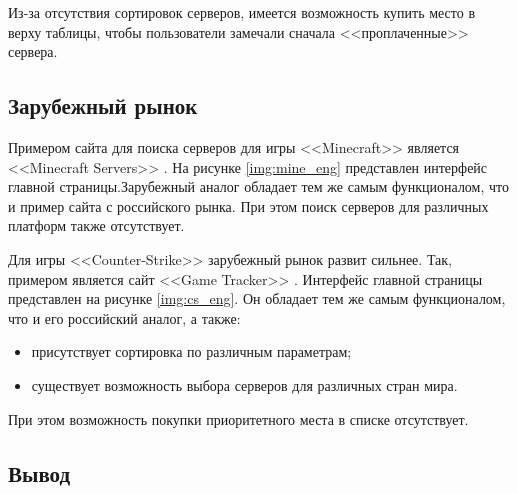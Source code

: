 Из-за отсутствия сортировок серверов, имеется возможность купить место в верху таблицы, чтобы пользователи замечали сначала <<проплаченные>> сервера. 


\subsection{Зарубежный рынок}

Примером сайта для поиска серверов для игры <<Minecraft>> \cite{minecraft} является <<Minecraft Servers>> \cite{mine-servs}. На рисунке \ref{img:mine_eng} представлен интерфейс главной страницы.Зарубежный аналог обладает тем же самым функционалом, что и пример сайта с российского рынка. При этом поиск серверов для различных платформ также отсутствует.

Для игры <<Counter-Strike>> \cite{cs} зарубежный рынок развит сильнее. Так, примером является сайт <<Game Tracker>> \cite{game-tracker}. Интерфейс главной страницы представлен на рисунке \ref{img:cs_eng}. Он обладает тем же самым функционалом, что и его российский аналог, а также:

\begin{itemize}
    \item присутствует сортировка по различным параметрам;
    \item существует возможность выбора серверов для различных стран мира.
\end{itemize}

При этом возможность покупки приоритетного места в списке отсутствует. 




\subsection{Вывод}

